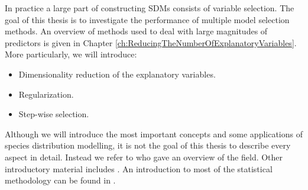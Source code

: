 In practice a large part of constructing SDMs consists of variable selection. The goal of this thesis is to investigate the performance of multiple model selection methods. An overview of methods used to deal with large magnitudes of predictors is given in Chapter \ref{ch:ReducingTheNumberOfExplanatoryVariables}. More particularly, we will introduce: 
\begin{itemize}
\item Dimensionality reduction of the explanatory variables. 
\item Regularization. 
\item Step-wise selection. 
\end{itemize}


Although we will introduce the most important concepts and some applications of species distribution modelling, it is not the goal of this thesis to describe every aspect in detail. Instead we refer to \cite{franklin_mapping_2009} who gave an overview of the field. Other introductory material includes
\cite{guisan_predictive_2000, guisan_predicting_2005, elith_species_2009}. An introduction to most of the statistical methodology can be found in \cite{hastie_elements_2009}.





















